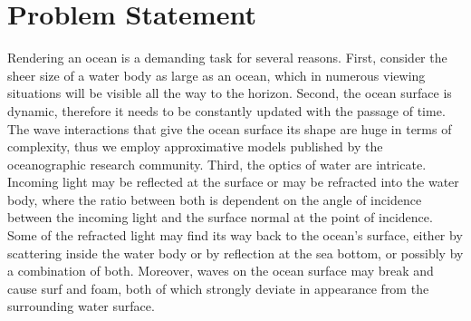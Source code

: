 \section{Problem Statement}
\label{sec:problem_statement}
%
Rendering an ocean is a demanding task for several reasons. First, consider the
sheer size of a water body as large as an ocean, which in numerous viewing
situations will be visible all the way to the horizon. Second, the ocean surface
is dynamic, therefore it needs to be constantly updated with the passage of time.
The wave interactions that give the ocean surface its shape are huge in terms of
complexity, thus we employ approximative models published by the oceanographic
research community.
Third, the optics of water are intricate. Incoming light may be reflected at the
surface or may be refracted into the water body, where the ratio between both is
dependent on the angle of incidence between the incoming light and the surface
normal at the point of incidence. Some of the refracted light may find its way
back to the ocean's surface, either by scattering inside the water body or by
reflection at the sea bottom, or possibly by a combination of both. Moreover,
waves on the ocean surface may break and cause surf and foam,
both of which strongly deviate in appearance from the surrounding water surface.
%
%
%
%
% 
% 
%
